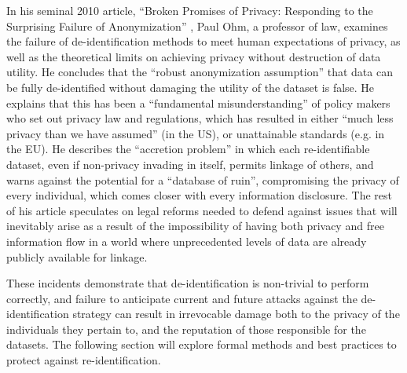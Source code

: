 

In his seminal 2010 article, ``Broken Promises of Privacy: Responding to the Surprising Failure of Anonymization'' \cite{Ohm2010}, Paul Ohm, a professor of law, examines the failure of de-identification methods to meet human expectations of privacy, as well as the theoretical limits on achieving privacy without destruction of data utility. He concludes that %
the ``robust anonymization assumption'' that data can be fully de-identified without damaging the utility of the dataset is false. He explains that this has been a ``fundamental misunderstanding'' of policy makers who set out privacy law and regulations, which has resulted in either ``much less privacy than we have assumed'' (in the US), or unattainable standards (e.g. in the EU). He describes the ``accretion problem'' in which each re-identifiable dataset, even if non-privacy invading in itself, permits linkage of others, and warns against the potential for a ``database of ruin'', compromising the privacy of every individual, which comes closer with every information disclosure. The rest of his article speculates on legal reforms needed to defend against issues that will inevitably arise as a result of the impossibility of having both privacy and free information flow in a world where unprecedented levels of data are already publicly available for linkage.


These incidents demonstrate that de-identification is non-trivial to perform correctly, and failure to anticipate current and future attacks against the de-identification strategy can result in irrevocable damage both to the privacy of the individuals they pertain to, and the reputation of those responsible for the datasets. The following section will explore formal methods and best practices to protect against re-identification.

